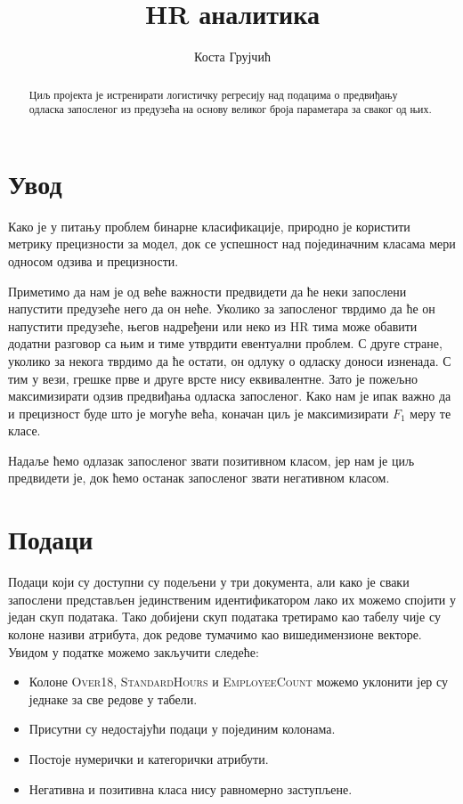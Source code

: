 \documentclass[12pt, a4paper]{article}
\begin{document}
\date{}
\title{HR аналитика}
\author{Коста Грујчић}
\maketitle

\begin{abstract}
	\noindent Циљ пројекта је истренирати логистичку регресију над подацима о предвиђању одласка запосленог из предузећа на основу великог броја параметара за сваког од њих.
\end{abstract}

\section{Увод}
	Како је у питању проблем бинарне класификације, природно је користити метрику прецизности за модел, док се успешност над појединачним класама мери односом одзива и прецизности.
	
	Приметимо да нам је од веће важности предвидети да ће неки запослени напустити предузеће него да он неће. Уколико за запосленог тврдимо да ће он напустити предузеће, његов надређени или неко из HR тима може обавити додатни разговор са њим и тиме утврдити евентуални проблем. С друге стране, уколико за некога тврдимо да ће остати, он одлуку о одласку доноси изненада. С тим у вези, грешке прве и друге врсте нису еквивалентне. Зато је пожељно максимизирати одзив предвиђања одласка запосленог. Како нам је ипак важно да и прецизност буде што је могуће већа, коначан циљ је максимизирати $F_1$ меру те класе.
	
	Надаље ћемо одлазак запосленог звати позитивном класом, јер нам је циљ предвидети је, док ћемо останак запосленог звати негативном класом.

\section{Подаци}
	Подаци који су доступни су подељени у три документа, али како је сваки запослени представљен јединственим идентификатором лако их можемо спојити у један скуп података. Тако добијени скуп података третирамо као табелу чије су колоне називи атрибута, док редове тумачимо као вишедимензионе векторе. Увидом у податке можемо закључити следеће:
	
	\begin{itemize}
		\item Колоне \textsc{Over18}, \textsc{StandardHours} и \textsc{EmployeeCount} можемо уклонити јер су једнаке за све редове у табели.
		\item Присутни су недостајући подаци у појединим колонама.
		\item Постоје нумерички и категорички атрибути.
		\item Негативна и позитивна класа нису равномерно заступљене.
	\end{itemize}
	
\end{document}
